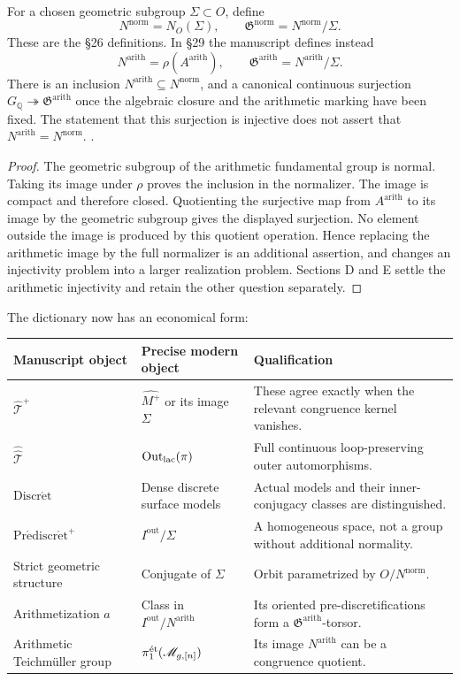For a chosen geometric subgroup $\Sigma\subset O$, define
\[
N^{\mathrm{norm}}=N_O(\Sigma),\qquad
\mathfrak G^{\mathrm{norm}}=N^{\mathrm{norm}}/\Sigma.
\]
These are the \S26 definitions. In \S29 the manuscript defines instead
\[
N^{\mathrm{arith}}=\rho(A^{\mathrm{arith}}),\qquad
\mathfrak G^{\mathrm{arith}}=N^{\mathrm{arith}}/\Sigma.
\]
There is an inclusion $N^{\mathrm{arith}}\subseteq N^{\mathrm{norm}}$, and a canonical continuous surjection
$G_{\mathbb Q}\twoheadrightarrow\mathfrak G^{\mathrm{arith}}$ once the algebraic closure and the arithmetic marking have been fixed. The statement that this surjection is injective does not assert that $N^{\mathrm{arith}}=N^{\mathrm{norm}}$.
.
\begin{proof}
The geometric subgroup of the arithmetic fundamental group is normal. Taking its image under $\rho$ proves the inclusion in the normalizer. The image is compact and therefore closed. Quotienting the surjective map from $A^{\mathrm{arith}}$ to its image by the geometric subgroup gives the displayed surjection. No element outside the image is produced by this quotient operation. Hence replacing the arithmetic image by the full normalizer is an additional assertion, and changes an injectivity problem into a larger realization problem. Sections D and E settle the arithmetic injectivity and retain the other question separately.
\end{proof}

\noindent The dictionary now has an economical form:
\begin{center}\small
\begin{tabularx}{\textwidth}{@{}L{.27\textwidth}L{.27\textwidth}Y@{}}
\toprule Manuscript object & Precise modern object & Qualification\\\midrule
$\widehat{\mathcal T}^+$ & $\widehat{M^+}$ or its image $\Sigma$ & These agree exactly when the relevant congruence kernel vanishes.\\
$\widehat{\widehat{\mathcal T}}$ & $\operatorname{Out}_{\mathrm{lac}}(\pi)$ & Full continuous loop-preserving outer automorphisms.\\
$\operatorname{Discr\acute et}$ & Dense discrete surface models & Actual models and their inner-conjugacy classes are distinguished.\\
$\operatorname{Pr\acute ediscr\acute et}^+$ & $I^{\mathrm{out}}/\Sigma$ & A homogeneous space, not a group without additional normality.\\
Strict geometric structure & Conjugate of $\Sigma$ & Orbit parametrized by $O/N^{\mathrm{norm}}$.\\
Arithmetization $a$ & Class in $I^{\mathrm{out}}/N^{\mathrm{arith}}$ & Its oriented pre-discretifications form a $\mathfrak G^{\mathrm{arith}}$-torsor.\\
Arithmetic Teichm\"uller group & $\pi_1^{\mathrm{\acute et}}(\mathscr M_{g,[n]})$ & Its image $N^{\mathrm{arith}}$ can be a congruence quotient.\\\bottomrule
\end{tabularx}
\end{center}

